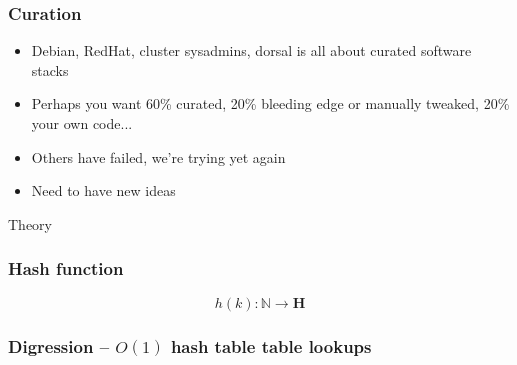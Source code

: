 \documentclass[sans,mathserif]{beamer}
\begin{document}
\begin{frame}
  \frametitle{Curation}
  
  \begin{itemize}
  \item<+-> Debian, RedHat, cluster sysadmins, dorsal is all about curated software stacks
  \item<+-> Perhaps you want 60\% curated, 20\% bleeding edge or manually tweaked, 20\% your own code...
  \end{itemize}
\end{frame}


\begin{frame}
  \begin{itemize}
  \item<+-> Others have failed, we're trying yet again
  \item<+-> Need to have new ideas
  \end{itemize}
\end{frame}

\begin{frame}
  \begin{center}
    {\Large Theory}
  \end{center}
\end{frame}



\begin{frame}
  \frametitle{Hash function}
  {\Large
\[ h(k) : \mathbb{N} \to \mathbf{H} \]
}
\end{frame}


\begin{frame}
  \frametitle{Digression -- $O(1)$ hash table table lookups}




~

\end{frame}
\end{document}
